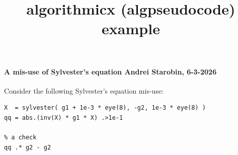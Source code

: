 \documentclass[12pt]{article}
\title{algorithmicx (algpseudocode) example}
\begin{document}
\paragraph{ A mis-use of Sylvester's equation  \small{ Andrei Starobin, 6-3-2026 } } %






Consider the following Sylvester's equation mis-use: 

\begin{verbatim}
X  = sylvester( g1 + 1e-3 * eye(8), -g2, 1e-3 * eye(8) )
qq = abs.(inv(X) * g1 * X) .>1e-1

% a check
qq .* g2 - g2
\end{verbatim}
\end{document}
